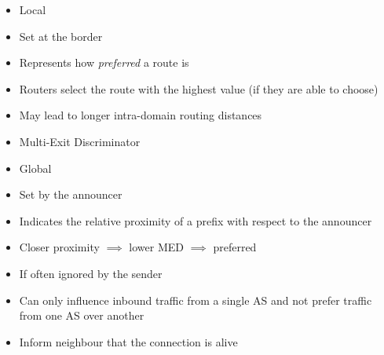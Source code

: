 \begin{itemize}
\begin{itemize}
\begin{itemize}
\begin{itemize}
\begin{itemize}
\begin{itemize}
\begin{itemize}
                                                    \item Local
                                                    \item Set at the border
                                                    \item Represents how \textit{preferred} a route is
                                                    \item Routers select the route with the highest value (if they are able to choose)
                                                    \item May lead to longer intra-domain routing distances
                                                \end{itemize}
                                                \begin{itemize}
                                                    \item Multi-Exit Discriminator
                                                    \item Global
                                                    \item Set by the announcer
                                                    \item Indicates the relative proximity of a prefix with respect to the announcer
                                                    \item Closer proximity $\implies$ lower MED $\implies$ preferred
                                                    \item If often ignored by the sender
                                                    \item Can only influence inbound traffic from a single AS and not prefer traffic from one AS over another
                                                \end{itemize}
                                        \end{itemize}
                                \end{itemize}
                                \begin{itemize}
                                    \item Inform neighbour that the connection is alive
                                \end{itemize}
                        \end{itemize}

\end{itemize}
\end{itemize}
\end{itemize}
